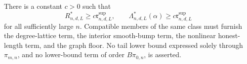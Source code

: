 There is a constant \(c>0\) such that
\[
 R^*_{n,d,L}\geq c\mathfrak r^{\mathrm{sup}}_{n,d,L},
 \qquad
 \Lambda^*_{n,d,L}(\alpha)\geq c\mathfrak r^{\mathrm{sup}}_{n,d,L}
\]
for all sufficiently large \(n\).  Compatible members of the same class must furnish the degree-lattice term, the interior smooth-bump term, the nonlinear honest-length term, and the graph floor.  No tail lower bound expressed solely through \(\pi_{m,n}\), and no lower-bound term of order \(B\pi_{0,n}\), is asserted.
